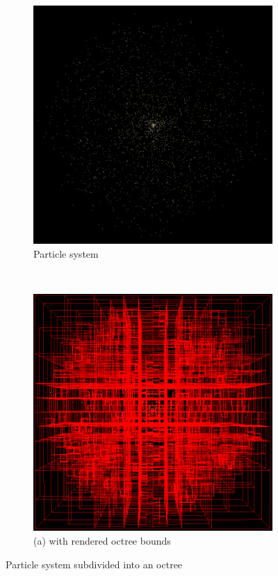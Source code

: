 
\begin{figure}[!htbp]
    \centering
    \begin{subfigure}[b]{0.65\textwidth}
        \includegraphics[width=\textwidth]{Method/Figs/PSNoBounds.png}
        \caption{Particle system}
    \end{subfigure}
    ~ 
    \begin{subfigure}[b]{0.65\textwidth}
        \includegraphics[width=\textwidth]{Method/Figs/PSWithBounds.png}
        \caption{(a) with rendered octree bounds}
    \end{subfigure}
    \caption{Particle system subdivided into an octree}
    \label{fig:OctreeVisualized}
\end{figure}



